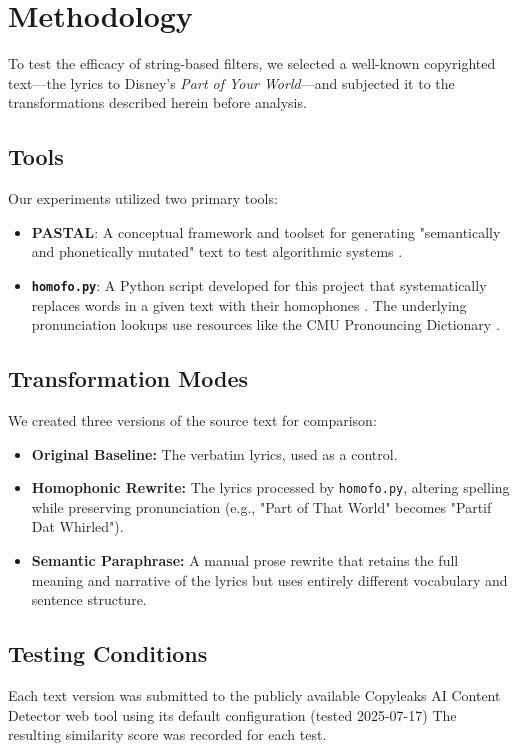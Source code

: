 \documentclass[12pt]{article}
\begin{document}
\section{Methodology}
To test the efficacy of string-based filters, we selected a well-known copyrighted text—the lyrics to Disney's \emph{Part of Your World}—and subjected it to the transformations described herein before analysis.

\subsection{Tools}
Our experiments utilized two primary tools:
\begin{itemize}
    \item \textbf{PASTAL}: A conceptual framework and toolset for generating "semantically and phonetically mutated" text to test algorithmic systems \cite{pastal-github}.
    \item \textbf{\texttt{homofo.py}}: A Python script developed for this project that systematically replaces words in a given text with their homophones \cite{homofo-github}. The underlying pronunciation lookups use resources like the CMU Pronouncing Dictionary \cite{cmudict}.
\end{itemize}


\subsection{Transformation Modes}
We created three versions of the source text for comparison:
\begin{itemize}
    \item \textbf{Original Baseline:} The verbatim lyrics, used as a control.
    \item \textbf{Homophonic Rewrite:} The lyrics processed by \texttt{homofo.py}, altering spelling while preserving pronunciation (e.g., "Part of That World" becomes "Partif Dat Whirled").
    \item \textbf{Semantic Paraphrase:} A manual prose rewrite that retains the full meaning and narrative of the lyrics but uses entirely different vocabulary and sentence structure.
\end{itemize}

\subsection{Testing Conditions}
Each text version was submitted to the publicly available Copyleaks AI Content Detector web tool using its default configuration (tested 2025-07-17) \cite{copyleaks-claim} The resulting similarity score was recorded for each test.
\end{document}
